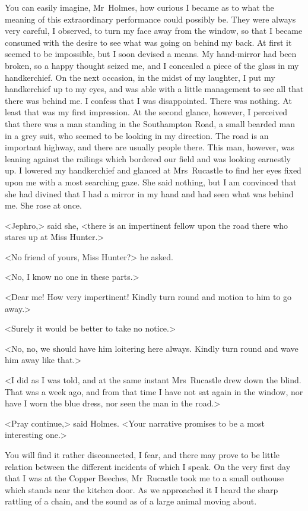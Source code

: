 You can easily imagine, Mr~Holmes, how curious I became as to what the meaning of this extraordinary performance could possibly be. They were always very careful, I observed, to turn my face away from the window, so that I became consumed with the desire to see what was going on behind my back. At first it seemed to be impossible, but I soon devised a means. My hand-mirror had been broken, so a happy thought seized me, and I concealed a piece of the glass in my handkerchief. On the next occasion, in the midst of my laughter, I put my handkerchief up to my eyes, and was able with a little management to see all that there was behind me. I confess that I was disappointed. There was nothing. At least that was my first impression. At the second glance, however, I perceived that there was a man standing in the Southampton Road, a small bearded man in a grey suit, who seemed to be looking in my direction. The road is an important highway, and there are usually people there. This man, however, was leaning against the railings which bordered our field and was looking earnestly up. I lowered my handkerchief and glanced at Mrs~Rucastle to find her eyes fixed upon me with a most searching gaze. She said nothing, but I am convinced that she had divined that I had a mirror in my hand and had seen what was behind me. She rose at once.

<Jephro,> said she, <there is an impertinent fellow upon the road there who stares up at Miss Hunter.>

<No friend of yours, Miss Hunter?> he asked.

<No, I know no one in these parts.>

<Dear me! How very impertinent! Kindly turn round and motion to him to go away.>

<Surely it would be better to take no notice.>

<No, no, we should have him loitering here always. Kindly turn round and wave him away like that.>

<I did as I was told, and at the same instant Mrs~Rucastle drew down the blind. That was a week ago, and from that time I have not sat again in the window, nor have I worn the blue dress, nor seen the man in the road.>

<Pray continue,> said Holmes. <Your narrative promises to be a most interesting one.>

You will find it rather disconnected, I fear, and there may prove to be little relation between the different incidents of which I speak. On the very first day that I was at the Copper Beeches, Mr~Rucastle took me to a small outhouse which stands near the kitchen door. As we approached it I heard the sharp rattling of a chain, and the sound as of a large animal moving about.

